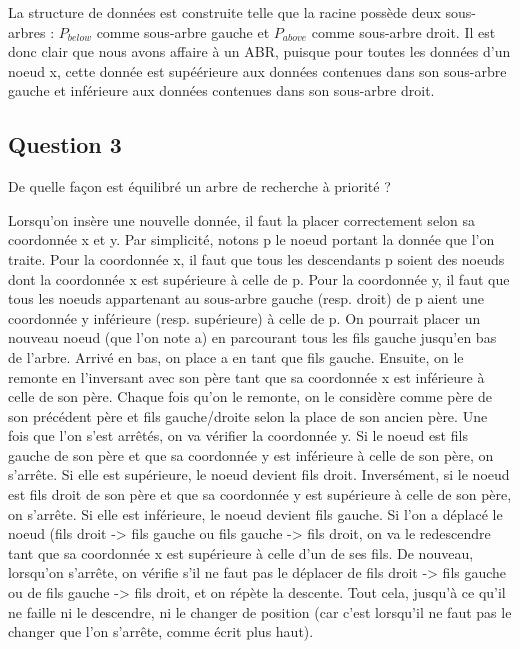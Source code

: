 \documentclass{article}
\newcommand{\gray}{\color{gray}}
\begin{document}
La structure de données est construite telle que la racine possède deux sous-arbres : $P_{below}$ comme sous-arbre gauche
et $P_{above}$ comme sous-arbre droit. Il est donc clair que nous avons affaire à un ABR, puisque pour toutes les données d'un noeud x, 
cette donnée est supéérieure aux données contenues dans son sous-arbre gauche et inférieure aux données contenues dans son sous-arbre droit.

\newpage

\subsection{Question 3} De quelle façon est équilibré un arbre de recherche à priorité ?

\bigskip

\gray

Lorsqu'on insère une nouvelle donnée, il faut la placer correctement selon sa coordonnée x et y. 
Par simplicité, notons p le noeud portant la donnée que l'on traite. 
Pour la coordonnée x, il faut que tous les descendants p soient des noeuds dont la coordonnée x est supérieure à celle de p. Pour la coordonnée y, 
il faut que tous les noeuds appartenant au sous-arbre gauche (resp. droit) de p aient une coordonnée y inférieure (resp. supérieure) à celle de p. 
On pourrait placer un nouveau noeud (que l'on note a) en parcourant tous les fils gauche jusqu'en bas de l'arbre. Arrivé en bas, on place a en tant que fils gauche. 
Ensuite, on le remonte en l'inversant avec son père tant que sa coordonnée x est inférieure à celle de son père. 
Chaque fois qu'on le remonte, on le considère comme père de son précédent père et fils gauche/droite selon la place de son ancien père. 
Une fois que l'on s'est arrêtés, on va vérifier la coordonnée y. Si le noeud est fils gauche de son père et que sa coordonnée y est inférieure à celle de son père, on s'arrête. 
Si elle est supérieure, le noeud devient fils droit. Inversément, si le noeud est fils droit de son père et que sa coordonnée y est supérieure à celle de son père, on s'arrête. 
Si elle est inférieure, le noeud devient fils gauche. Si l'on a déplacé le noeud (fils droit -> fils gauche ou fils gauche -> fils droit, 
on va le redescendre tant que sa coordonnée x est supérieure à celle d'un de ses fils. De nouveau, lorsqu'on s'arrête, 
on vérifie s'il ne faut pas le déplacer de fils droit -> fils gauche ou de fils gauche -> fils droit,
et on répète la descente. Tout cela, jusqu'à ce qu'il ne faille ni le descendre, ni le changer de position 
(car c'est lorsqu'il ne faut pas le changer que l'on s'arrête, comme écrit plus haut). 
\end{document}
